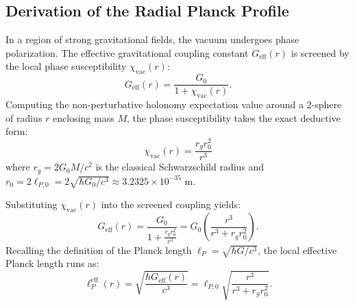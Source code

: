 \documentclass[11pt,a4paper]{article}
\begin{document}
\subsection{Derivation of the Radial Planck Profile}
In a region of strong gravitational fields, the vacuum undergoes phase polarization. The effective gravitational coupling constant $G_{\mathrm{eff}}(r)$ is screened by the local phase susceptibility $\chi_{\mathrm{vac}}(r)$:
\begin{equation}
G_{\mathrm{eff}}(r) = \frac{G_0}{1 + \chi_{\mathrm{vac}}(r)}.
\end{equation}
Computing the non-perturbative holonomy expectation value around a 2-sphere of radius $r$ enclosing mass $M$, the phase susceptibility takes the exact deductive form:
\begin{equation}
\chi_{\mathrm{vac}}(r) = \frac{r_g r_0^2}{r^3}
\end{equation}
where $r_g = 2 G_0 M / c^2$ is the classical Schwarzschild radius and $r_0 = 2\ell_{P,0} = 2\sqrt{\hbar G_0 / c^3} \approx 3.2325 \times 10^{-35}\text{ m}$.

Substituting $\chi_{\mathrm{vac}}(r)$ into the screened coupling yields:
\begin{equation}
G_{\mathrm{eff}}(r) = \frac{G_0}{1 + \frac{r_g r_0^2}{r^3}} = G_0 \left( \frac{r^3}{r^3 + r_g r_0^2} \right).
\end{equation}
Recalling the definition of the Planck length $\ell_P = \sqrt{\hbar G / c^3}$, the local effective Planck length runs as:
\begin{equation}
\ell_P^{\mathrm{eff}}(r) = \sqrt{\frac{\hbar G_{\mathrm{eff}}(r)}{c^3}} = \ell_{P,0} \sqrt{\frac{r^3}{r^3 + r_g r_0^2}}.
\end{equation}
\end{document}
